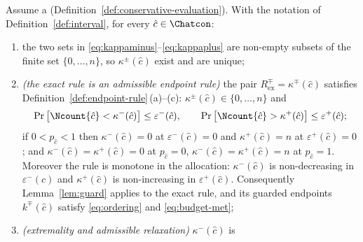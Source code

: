 
\begin{proposition}\label{prop:rule-exact}
Assume a 
(Definition~\ref{def:conservative-evaluation}). With the notation of
Definition~\ref{def:interval}, for every $\hat c\in\Chatcon$:
\begin{enumerate}[label=(\roman*),leftmargin=2.2em]
\item the two sets in \eqref{eq:kappaminus}--\eqref{eq:kappaplus} are non-empty
subsets of the finite set $\{0,\dots,n\}$, so $\kappa^{\pm}(\hat c)$ exist and
are unique;
\item \emph{(the exact rule is an admissible endpoint rule)} the pair
$R^{\mp}_{\mathrm{ex}}=\kappa^{\mp}(\hat c)$ satisfies
Definition~\ref{def:endpoint-rule}\,(a)--(c): $\kappa^{\pm}(\hat c)\in
\{0,\dots,n\}$ and
\begin{equation}\label{eq:exact-admissible}
  \Pr\big[\Ncount{\hat c}<\kappa^{-}(\hat c)\big]\le\varepsilon^{-}(\hat c),
  \qquad
  \Pr\big[\Ncount{\hat c}>\kappa^{+}(\hat c)\big]\le\varepsilon^{+}(\hat c);
\end{equation}
if $0<p_{\hat c}<1$ then $\kappa^{-}(\hat c)=0$ at $\varepsilon^{-}(\hat c)=0$
and $\kappa^{+}(\hat c)=n$ at $\varepsilon^{+}(\hat c)=0$; and
$\kappa^{-}(\hat c)=\kappa^{+}(\hat c)=0$ at $p_{\hat c}=0$,
$\kappa^{-}(\hat c)=\kappa^{+}(\hat c)=n$ at $p_{\hat c}=1$. Moreover the
rule is monotone in the allocation: $\kappa^{-}(\hat c)$ is non-decreasing in
$\varepsilon^{-}(\hat c)$ and $\kappa^{+}(\hat c)$ is non-increasing in
$\varepsilon^{+}(\hat c)$. Consequently Lemma~\ref{lem:guard} applies to the
exact rule, and its guarded endpoints $k^{\mp}(\hat c)$ satisfy
\eqref{eq:ordering} and \eqref{eq:budget-met};
\item \emph{(extremality and admissible relaxation)} $\kappa^{-}(\hat c)$ is

\end{enumerate}
\end{proposition}
